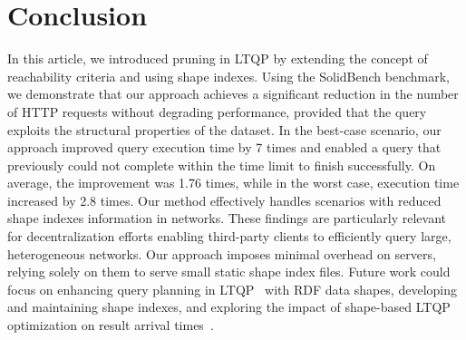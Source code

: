 \section{Conclusion}

In this article, we introduced pruning in LTQP by extending the concept of reachability criteria and using shape indexes.
Using the SolidBench benchmark, we demonstrate that our approach achieves a significant reduction in the number of HTTP requests without degrading performance, provided that the query exploits the structural properties of the dataset.
In the best-case scenario, our approach improved query execution time by 7 times and enabled a query that previously could not complete within the time limit to finish successfully.
On average, the improvement was 1.76 times, while in the worst case, execution time increased by 2.8 times.
Our method effectively handles scenarios with reduced shape indexes information in networks.
These findings are  particularly relevant for decentralization efforts enabling third-party clients to efficiently query large, heterogeneous networks.
Our approach imposes minimal overhead on servers, relying solely on them to serve small static shape index files.
Future work could focus on enhancing query planning in LTQP~\cite{taelman2024towards} with RDF data shapes, developing and maintaining shape indexes, and exploring the impact of shape-based LTQP optimization on result arrival times~\cite{Acosta2017}.

